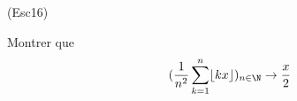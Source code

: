 \begin{tiny}(Esc16)\end{tiny} Montrer que
\[
(\frac{1}{n^{2}}\sum_{k=1}^{n}\lfloor kx\rfloor)_{n\in \N}\rightarrow
\frac{x}{2}
\]